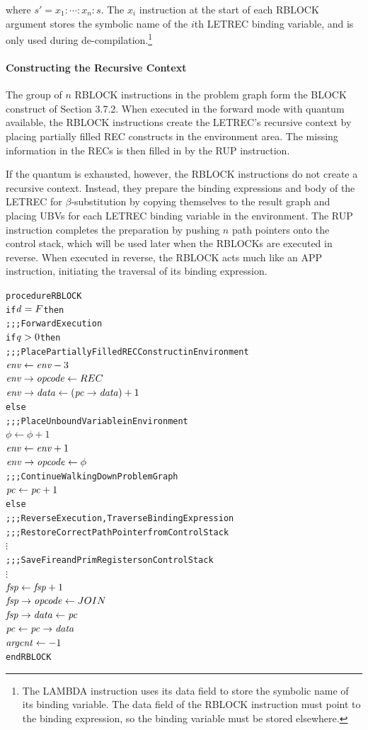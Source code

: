 where \(s' = x_1:\cdots:x_n:s\). The \(x_i\)\THOR{)} instruction at the start
of each RBLOCK argument stores the symbolic name of the \(i\)th LETREC binding variable,
and is only used during de-compilation.\footnote{The LAMBDA instruction uses its data
field to store the symbolic name of its binding variable. The data field of the RBLOCK
instruction must point to the binding expression, so the binding variable must be stored
elsewhere.}


\paragraph{Constructing the Recursive Context}
The group of \(n\) RBLOCK instructions in the problem graph form the BLOCK construct of
Section 3.7.2. When executed in the forward mode with quantum available, the RBLOCK
instructions create the LETREC's recursive context by placing partially filled REC
constructs in the environment area. The missing information in the RECs is then filled in
by the RUP instruction.

If the quantum is exhausted, however, the RBLOCK instructions do not create a recursive
context. Instead, they prepare the binding expressions and body of the LETREC for
\(\beta\)-substitution by copying themselves to the result graph and placing UBVs for each
LETREC binding variable in the environment. The RUP instruction completes the preparation
by pushing \(n\) path pointers onto the control stack, which will be used later when the
RBLOCKs are executed in reverse. When executed in reverse, the RBLOCK acts much like an
APP instruction, initiating the traversal of its binding expression.

\begin{alltt}
procedure RBLOCK
  if \(\rt{d} = F\) then
    ;;; Forward Execution
    if \(\rt{q} > 0\) then
      ;;; Place Partially Filled REC Construct in Environment
      \(\rt{env} \leftarrow \rt{env}-3\)
      \(\rtfield{env}{opcode} \leftarrow REC\)
      \(\rtfield{env}{data} \leftarrow (\rtfield{pc}{data})+1\)
    else
      ;;; Place Unbound Variable in Environment
      \(\phi \leftarrow \phi+1\)
      \(\rt{env} \leftarrow \rt{env}+1\)
      \(\rtfield{env}{opcode} \leftarrow \phi\)
    ;;; Continue Walking Down Problem Graph
    \(\rt{pc} \leftarrow \rt{pc}+1\)
  else
    ;;; Reverse Execution, Traverse Binding Expression
    ;;; Restore Correct Path Pointer from Control Stack
    \(\vdots\)
    ;;; Save Fire and Prim Registers on Control Stack
    \(\vdots\)
    \(\rt{fsp} \leftarrow \rt{fsp}+1\)
    \(\rtfield{fsp}{opcode} \leftarrow JOIN\)
    \(\rtfield{fsp}{data} \leftarrow \rt{pc}\)
    \(\rt{pc} \leftarrow \rtfield{pc}{data}\)
    \(\rt{argcnt} \leftarrow -1\)
end RBLOCK
\end{alltt}

